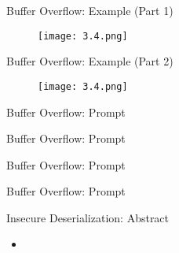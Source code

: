 \documentclass[t,ignorenonframetext]{beamer}
\begin{document}
\begin{frame}{Buffer Overflow: Example (Part 1)}
\begin{figure}[htb]
	\centering
	\texttt{[image: 3.4.png]}
\end{figure}

\end{frame}
\begin{frame}{Buffer Overflow: Example (Part 2)}
\begin{figure}[htb]
	\centering
	\texttt{[image: 3.4.png]}
\end{figure}

\end{frame}
\begin{frame}{Buffer Overflow: Prompt}
\begin{tcolorbox}
[colback=blue!5!white,colframe=navy!75!black,title=Persona]

\end{tcolorbox}
\end{frame}
\begin{frame}{Buffer Overflow: Prompt}
\begin{tcolorbox}
[colback=blue!5!white,colframe=navy!75!black,title=Context]

\end{tcolorbox}
\end{frame}

\begin{frame}{Buffer Overflow: Prompt}
\begin{tcolorbox}
[colback=blue!5!white,colframe=navy!75!black,title=Tasks (Part 1)]

\end{tcolorbox}
\end{frame}

\begin{frame}{Buffer Overflow: Prompt}
\begin{tcolorbox}
[colback=blue!5!white,colframe=navy!75!black,title=Tasks (Part 2)]

\end{tcolorbox}
\end{frame}

\begin{frame}{Insecure Deserialization: Abstract}
\begin{itemize}
    \item 
\end{itemize}
\end{frame}
\end{document}
